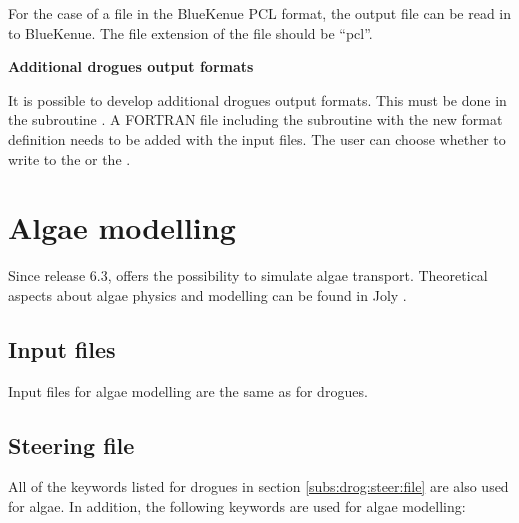 For the case of a file in the BlueKenue PCL format, the output file can be read
in to BlueKenue.
The file extension of the file should be “pcl”.
 
\textbf{Additional drogues output formats}

It is possible to develop additional drogues output formats.
This must be done in the subroutine .
A FORTRAN file including the subroutine  with the new
format definition needs to be added with the input files.
The user can choose whether to write to the 
or the .

\section{Algae modelling}
\label{sec:algae:bloom}
Since release 6.3,  offers the possibility to simulate algae
transport.
Theoretical aspects about algae physics and modelling can be found
in Joly \cite{Joly2011}.


\subsection{Input files}

Input files for algae modelling are the same as for drogues.


\subsection{Steering file}

All of the keywords listed for drogues in section \ref{subs:drog:steer:file}
are also used for algae.
In addition, the following keywords are used for algae modelling:

